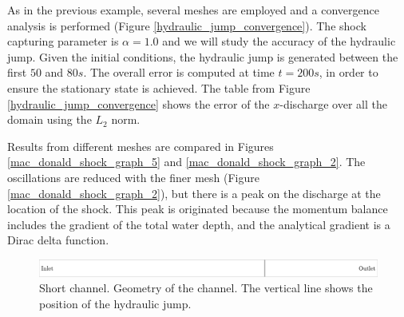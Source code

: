 \documentclass[a4paper,12pt]{elsarticle}
\begin{document}
As in the previous example, several meshes are employed and a convergence analysis is performed (Figure \ref{hydraulic_jump_convergence}). The shock capturing parameter is $\alpha=1.0$ and we will study the accuracy of the hydraulic jump. 
Given the initial conditions, the hydraulic jump is generated between the first $50$ and $80s$. The overall error is computed at time $t=200s$, in order to ensure the stationary state is achieved.
The table from Figure \ref{hydraulic_jump_convergence} shows the error of the $x$-discharge over all the domain using the $L_2$ norm.

Results from different meshes are compared in Figures \ref{mac_donald_shock_graph_5} and \ref{mac_donald_shock_graph_2}. The oscillations are reduced with the finer mesh (Figure \ref{mac_donald_shock_graph_2}), but there is a peak on the discharge at the location of the shock. This peak is originated because the momentum balance includes the gradient of the total water depth, and the analytical gradient is a Dirac delta function.

\begin{figure}
    \includegraphics[width=\textwidth]{img/jump/sketch.pdf}
    \caption{Short channel. Geometry of the channel. The vertical line shows the position of the hydraulic jump.}
    \label{chanel_geometry}
\end{figure}
\end{document}
